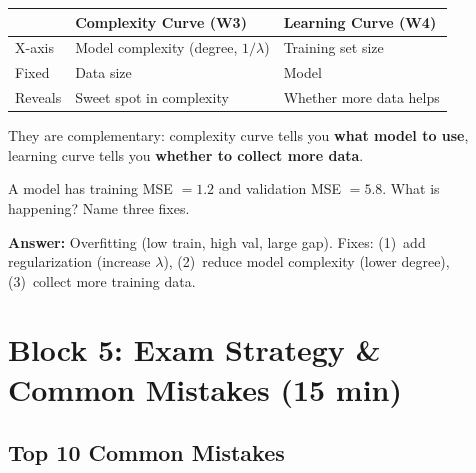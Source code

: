 \documentclass[11pt,a4paper]{article}
\begin{document}
\begin{center}
\begin{tabular}{|l|l|l|}
\hline
 & \textbf{Complexity Curve (W3)} & \textbf{Learning Curve (W4)} \\
\hline
X-axis & Model complexity (degree, $1/\lambda$) & Training set size \\
Fixed & Data size & Model \\
Reveals & Sweet spot in complexity & Whether more data helps \\
\hline
\end{tabular}
\end{center}

They are complementary: complexity curve tells you \textbf{what model to use}, learning curve tells you \textbf{whether to collect more data}.

\begin{tcolorbox}[colback=blue!5,colframe=blue!50,title=Mini-Exercise (3 min)]
A model has training MSE $= 1.2$ and validation MSE $= 5.8$. What is happening? Name three fixes.
\end{tcolorbox}
\noindent\textbf{Answer:} Overfitting (low train, high val, large gap). Fixes: (1)~add regularization (increase $\lambda$), (2)~reduce model complexity (lower degree), (3)~collect more training data.

\section{Block 5: Exam Strategy \& Common Mistakes (15 min)}

\subsection{Top 10 Common Mistakes}
\end{document}
